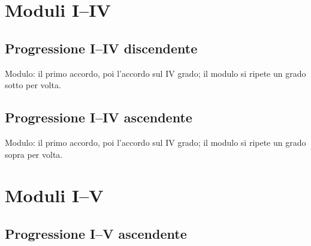 \section{Moduli I--IV}
\label{sec:moduli_i4}

\subsection{Progressione I--IV discendente}
\label{subsec:prog_i4d}

Modulo: il primo accordo, poi l'accordo sul IV grado; il modulo si ripete un grado sotto per volta.

\begin{esempio}
	\label{ex:prog_i4d_dia}
\end{esempio}

\begin{esempio}
	\label{ex:prog_i4d_rea}
\end{esempio}

\subsection{Progressione I--IV ascendente}
\label{subsec:prog_i4a}

Modulo: il primo accordo, poi l'accordo sul IV grado; il modulo si ripete un grado sopra per volta.

\begin{esempio}
	\label{ex:prog_i4a_dia}
\end{esempio}

\begin{esempio}
	\label{ex:prog_i4a_rea}
\end{esempio}

\section{Moduli I--V}
\label{sec:moduli_i5}

\subsection{Progressione I--V ascendente}
\label{subsec:prog_i5a}

